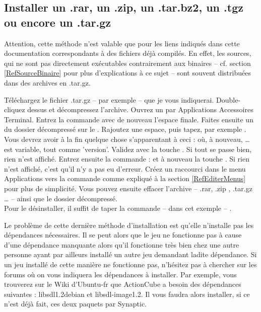 \subsection{Installer un .rar, un .zip, un .tar.bz2, un .tgz ou encore un .tar.gz}
\begin{nota}
Attention, cette méthode n'est valable que pour les liens indiqués dans cette documentation correspondants à des fichiers déjà compilés. En effet, les sources, qui ne sont pas directement exécutables contrairement aux binaires -- cf. section \ref{RefSourceBinaire} pour plus d'explications à ce sujet -- sont souvent distribuées dans des archives en .tar.gz.
\end{nota}
Téléchargez le fichier .tar.gz -- par exemple -- que je vous indiquerai. Double-cliquez dessus et décompressez l'archive. Ouvrez un  par Applications \FlecheDroite Accessoires \FlecheDroite Terminal. Entrez la commande  avec de nouveau l'espace finale. Faites ensuite un  du dossier décompressé sur le . Rajoutez une espace, puis tapez, par exemple . Vous devrez avoir à la fin quelque chose s'apparentant à ceci :  où, à nouveau, \ldots{} est variable, tout comme 'version'. Validez avec la touche . Si tout se passe bien, rien n'est affiché. Entrez ensuite la commande :  et à nouveau la touche . Si rien n'est affiché, c'est qu'il n'y a pas eu d'erreur. Créez un raccourci dans le menu Applications vers la commande  comme expliqué à la section \ref{RefEditerMenus} pour plus de simplicité. Vous pouvez ensuite effacer l'archive -- .rar, .zip , .tar.gz \ldots{} -- ainsi que le dossier décompressé.\\
Pour le désinstaller, il suffit de taper la commande -- dans cet exemple -- .
\begin{nota}
Le problème de cette dernière méthode d'installation est qu'elle n'installe pas les dépendances nécessaires. Il se peut alors que le jeu ne fonctionne pas à cause d'une dépendance manquante alors qu'il fonctionne très bien chez une autre personne ayant par ailleurs installé un autre jeu demandant ladite dépendance. Si un jeu installé de cette manière ne fonctionne pas, n'hésitez pas à chercher sur les forums où on vous indiquera les dépendances à installer. Par exemple, vous trouverez sur le Wiki d'Ubuntu-fr que ActionCube a besoin des dépendances suivantes : libsdl1.2debian et libsdl-image1.2. Il vous faudra alors installer, si ce n'est déjà fait, ces deux paquets par Synaptic.
\end{nota}
